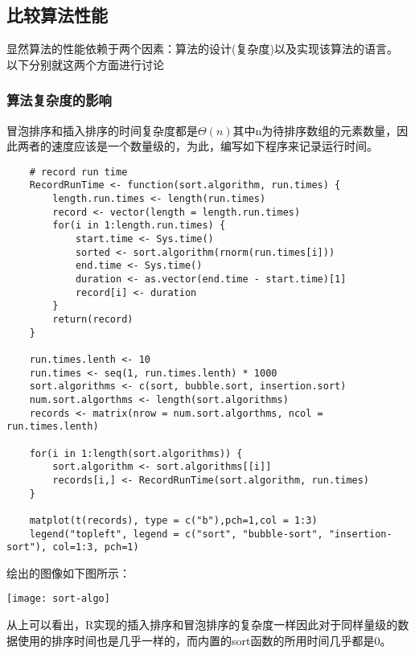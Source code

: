 \documentclass[UTF8]{article}
\begin{document}
	\subsection{比较算法性能}
	显然算法的性能依赖于两个因素：算法的设计(复杂度)以及实现该算法的语言。
	以下分别就这两个方面进行讨论
	\subsubsection{算法复杂度的影响}
	冒泡排序和插入排序的时间复杂度都是$\Theta(n)$其中n为待排序数组的元素数量，因此两者的速度应该是一个数量级的，为此，编写如下程序来记录运行时间。
	\begin{lstlisting}
	# record run time
	RecordRunTime <- function(sort.algorithm, run.times) {
		length.run.times <- length(run.times)
		record <- vector(length = length.run.times)
		for(i in 1:length.run.times) {
			start.time <- Sys.time()
			sorted <- sort.algorithm(rnorm(run.times[i]))
			end.time <- Sys.time()
			duration <- as.vector(end.time - start.time)[1]
			record[i] <- duration
		}
		return(record)
	}
	
	run.times.lenth <- 10
	run.times <- seq(1, run.times.lenth) * 1000
	sort.algorithms <- c(sort, bubble.sort, insertion.sort)
	num.sort.algorthms <- length(sort.algorithms)
	records <- matrix(nrow = num.sort.algorthms, ncol = run.times.lenth)
	
	for(i in 1:length(sort.algorithms)) {
		sort.algorithm <- sort.algorithms[[i]]
		records[i,] <- RecordRunTime(sort.algorithm, run.times)
	}
	
	matplot(t(records), type = c("b"),pch=1,col = 1:3) 
	legend("topleft", legend = c("sort", "bubble-sort", "insertion-sort"), col=1:3, pch=1) 
	\end{lstlisting}
	绘出的图像如下图所示：
	
	\texttt{[image: sort-algo]}
	
	从上可以看出，R实现的插入排序和冒泡排序的复杂度一样因此对于同样量级的数据使用的排序时间也是几乎一样的，而内置的sort函数的所用时间几乎都是0。
	
\end{document}
